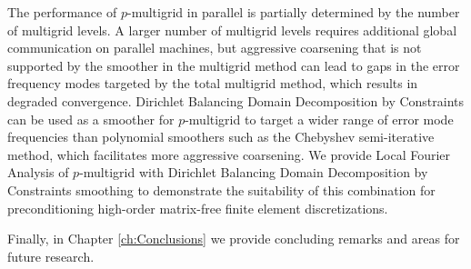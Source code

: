 The performance of $p$-multigrid in parallel is partially determined by the number of multigrid levels.
A larger number of multigrid levels requires additional global communication on parallel machines, but aggressive coarsening that is not supported by the smoother in the multigrid method can lead to gaps in the error frequency modes targeted by the total multigrid method, which results in degraded convergence.
Dirichlet Balancing Domain Decomposition by Constraints can be used as a smoother for $p$-multigrid to target a wider range of error mode frequencies than polynomial smoothers such as the Chebyshev semi-iterative method, which facilitates more aggressive coarsening.
We provide Local Fourier Analysis of $p$-multigrid with Dirichlet Balancing Domain Decomposition by Constraints smoothing to demonstrate the suitability of this combination for preconditioning high-order matrix-free finite element discretizations.

Finally, in Chapter \ref{ch:Conclusions} we provide concluding remarks and areas for future research.
